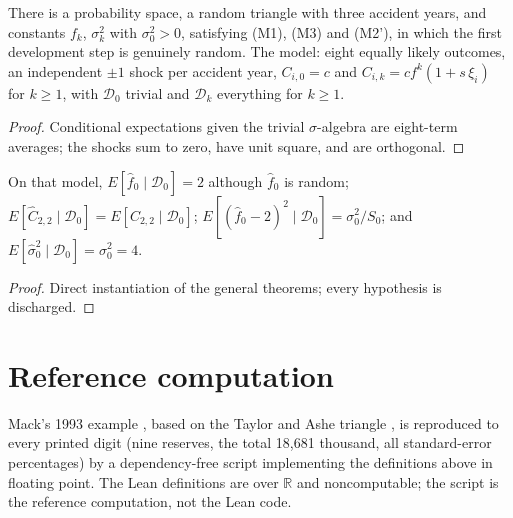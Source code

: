 \begin{theorem}\label{thm:nontrivial}\leanok
{}
There is a probability space, a random triangle with three accident years, and constants
$f_k$, $\sigma_k^2$ with $\sigma_0^2 > 0$, satisfying (M1), (M3) and (M2'), in which the first
development step is genuinely random. The model: eight equally likely outcomes, an independent
$\pm 1$ shock per accident year, $C_{i,0} = c$ and $C_{i,k} = c f^k (1 + s\,\xi_i)$ for $k \ge 1$,
with $\mathcal{D}_0$ trivial and $\mathcal{D}_k$ everything for $k \ge 1$.
\end{theorem}
\begin{proof}\leanok Conditional expectations given the trivial $\sigma$-algebra are eight-term averages; the shocks sum to zero, have unit square, and are orthogonal. \end{proof}

\begin{theorem}\label{thm:instantiated}\leanok
{}
On that model, $E[\hat f_0 \mid \mathcal{D}_0] = 2$ although $\hat f_0$ is random;
$E[\hat C_{2,2} \mid \mathcal{D}_0] = E[C_{2,2} \mid \mathcal{D}_0]$;
$E[(\hat f_0 - 2)^2 \mid \mathcal{D}_0] = \sigma_0^2 / S_0$; and $E[\hat\sigma_0^2 \mid \mathcal{D}_0] = \sigma_0^2 = 4$.
\end{theorem}
\begin{proof}\leanok Direct instantiation of the general theorems; every hypothesis is discharged. \end{proof}

\chapter{Reference computation}

Mack's 1993 example \cite{Mack1993}, based on the Taylor and Ashe triangle
\cite{TaylorAshe1983}, is reproduced to every printed digit
(nine reserves, the total 18,681 thousand, all standard-error percentages) by a dependency-free
script implementing the definitions above in floating point. The Lean definitions are over
$\mathbb{R}$ and noncomputable; the script is the reference computation, not the Lean code.

